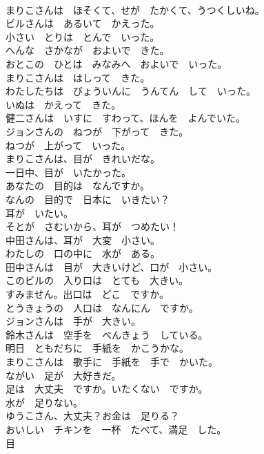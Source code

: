 \documentclass[8pt]{extreport}
\begin{document}
\begin{CJK}{UTF8}{min}
\\	まりこさんは　ほそくて、せが　たかくて、うつくしいね。	
\\	ビルさんは　あるいて　かえった。	
\\	小さい　とりは　とんで　いった。	
\\	へんな　さかなが　およいで　きた。	
\\	おとこの　ひとは　みなみへ　およいで　いった。	
\\	まりこさんは　はしって　きた。	
\\	わたしたちは　びょういんに　うんてん　して　いった。	
\\	いぬは　かえって　きた。	
\\	健二さんは　いすに　すわって、ほんを　よんでいた。	
\\	ジョンさんの　ねつが　下がって　きた。	
\\	ねつが　上がって　いった。	
\\	まりこさんは、目が　きれいだな。	
\\	一日中、目が　いたかった。	
\\	あなたの　目的は　なんですか。	
\\	なんの　目的で　日本に　いきたい？	
\\	耳が　いたい。	
\\	そとが　さむいから、耳が　つめたい！	
\\	中田さんは、耳が　大変　小さい。	
\\	わたしの　口の中に　水が　ある。	
\\	田中さんは　目が　大きいけど、口が　小さい。	
\\	このビルの　入り口は　とても　大きい。	
\\	すみません。出口は　どこ　ですか。	
\\	とうきょうの　人口は　なんにん　ですか。	
\\	ジョンさんは　手が　大きい。	
\\	鈴木さんは　空手を　べんきょう　している。	
\\	明日　ともだちに　手紙を　かこうかな。	
\\	まりこさんは　歌手に　手紙を　手で　かいた。	
\\	ながい　足が　大好きだ。	
\\	足は　大丈夫　ですか。いたくない　ですか。	
\\	水が　足りない。	
\\	ゆうこさん、大丈夫？お金は　足りる？	
\\	おいしい　チキンを　一杯　たべて、満足　した。	
\\	目	

\end{CJK}
\end{document}
